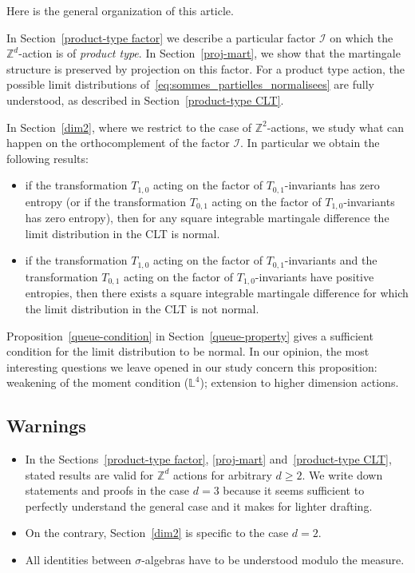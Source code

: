 \documentclass[AHL,Unicode,longabstracts,published]{cedram}
\newcommand{\Z}{\mathbb{Z}}
\newcommand*\bbL{\mathbb{L}}
\newcommand*\I{\mathcal{I}}
\begin{document}
Here is the general organization of this article.

In Section~\ref{product-type factor} we describe a particular factor $\I$ on which the {$\Z^d$-action} is of \emph{product type}. In Section~\ref{proj-mart}, we show that the martingale structure is preserved by projection on this factor. For a product type action, the possible limit distributions of~\eqref{eq:sommes_partielles_normalisees} are fully understood, as described in Section~\ref{product-type CLT}.

In Section~\ref{dim2}, where we restrict to the case of $\Z^2$-actions, we study what can happen on the orthocomplement of the factor $\I$. In particular we obtain the following results:
\begin{itemize}
\item if the transformation $T_{1,0}$ acting on the factor of $T_{0,1}$-invariants has zero entropy (or if the transformation $T_{0,1}$ acting on the factor of $T_{1,0}$-invariants has zero entropy), then for any square integrable martingale difference the limit distribution in the CLT is normal.

\item if the transformation $T_{1,0}$ acting on the factor of $T_{0,1}$-invariants and the transformation $T_{0,1}$ acting on the factor of $T_{1,0}$-invariants have positive entropies, then there exists a square integrable martingale difference for which the limit distribution in the CLT is not normal.
\end{itemize}
{Proposition~\ref{queue-condition} in Section~\ref{queue-property} gives a sufficient condition for the limit distribution to be normal. In our opinion, the most interesting questions we leave opened in our study concern this proposition: weakening of the moment condition ($\bbL^4$); extension to higher dimension actions.}

\subsection*{Warnings}

\begin{itemize}
\item In the Sections~\ref{product-type factor}, \ref{proj-mart} and~\ref{product-type CLT}, stated results are valid for $\Z^d$ actions for arbitrary $d\geq 2$. We write down statements and proofs in the case $d=3$ because it seems sufficient to perfectly understand the general case and it makes for lighter drafting.
\item On the contrary, Section~\ref{dim2} is specific to the case $d=2$.
\item All identities between $\sigma$-algebras have to be understood modulo the measure.
\end{itemize}
\end{document}
